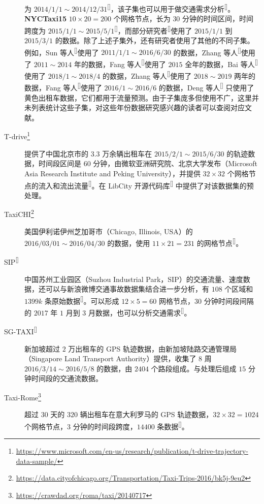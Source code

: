 \documentclass{ctexart}
\renewcommand{\cite}[1]{\textsuperscript{[\citenum{#1}]}}
\begin{document}
\begin{description}
    为 $2014/1/1\sim2014/12/31$\cite{T-ZS45}，该子集也可以用于做交通需求分析\cite{T-153}。\textbf{NYCTaxi15} $10\times20=200$ 个网格节点，长为 $30$ 分钟的时间区间，时间跨度为 $2015/1/1\sim2015/5/1$\cite{T-ZS45}，而部分研究者\cite{T-162, T-368}使用了 $2015/1/1$ 到 $2015/3/1$ 的数据。除了上述子集外，还有研究者使用了其他的不同子集。例如，Sun 等人\cite{T-203}使用了 $2011/1/1\sim2016/6/30$ 的数据，Zhang 等人\cite{T-204}使用了 $2011\sim2014$ 年的数据，Fang 等人\cite{T-274}使用了 $2015$ 全年的数据，Bai 等人\cite{T-218}使用了 $2018/1\sim2018/4$ 的数据，Zhang 等人\cite{T-291}使用了 $2018\sim2019$ 两年的数据，Fang 等人\cite{T-301}使用了 $2016/1\sim2016/6$ 的数据，Deng 等人\cite{T-354} 只使用了黄色出租车数据，它们都用于流量预测。由于子集庞多但使用不广，这里并未列表统计这些子集，对这些年份数据研究感兴趣的读者可以查阅对应文献。
\\
    \item[T-drive\footnote{\url{https://www.microsoft.com/en-us/research/publication/t-drive-trajectory-data-sample/}}] 提供了中国北京市的 $3.3$ 万余辆出租车在 $2015/2/1\sim2015/6/30$ 的轨迹数据，时间段区间是 $60$ 分钟，由微软亚洲研究院、北京大学发布（Microsoft Asia Research Institute and Peking University），并提供 $32\times32$ 个网格节点的流入和流出流量\cite{T-151}。在 LibCity 开源代码库\cite{O-32} 中提供了对该数据集的预处理。
    \item[TaxiCHI\footnote{\url{https://data.cityofchicago.org/Transportation/Taxi-Trips-2016/bk5j-9eu2}}] 美国伊利诺伊州芝加哥市（Chicago, Illinois, USA）的 $2016/03/01\sim2016/04/30$ 的数据，使用 $11\times21=231$ 的网格节点\cite{T-301}。
    \item[SIP\cite{T-92}] 中国苏州工业园区（Suzhou Industrial Park，SIP）的交通流量、速度数据，还可以与新浪微博交通事故数据集结合进一步分析，有 $108$ 个区域和 $1399k$ 条原始数据\cite{T-92}。可以形成 $12\times5=60$ 网格节点，$30$ 分钟时间段间隔的 $2017$ 年 $1$ 月到 $3$ 月数据，也可以分析交通需求\cite{T-283}。
    \item[SG-TAXI\cite{T-292}] 新加坡超过 $2$ 万出租车的 GPS 轨迹数据，由新加坡陆路交通管理局（Singapore Land Transport Authority）提供，收集了 $8$ 周 $2016/3/14\sim2016/5/8$ 的数据，由 $2404$ 个路段组成。与处理后组成 $15$ 分钟时间段的交通流数据。
    \item[Taxi-Rome\footnote{\url{https://crawdad.org/roma/taxi/20140717}}] 超过 $30$ 天的 $320$ 辆出租车在意大利罗马的 GPS 轨迹数据，$32\times32=1024$ 个网格节点，$3$ 分钟的时间段跨度，$14400$ 条数据\cite{T-297}。
\end{description}
\end{document}
